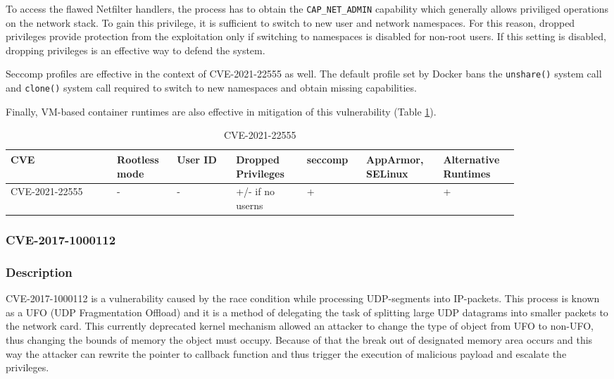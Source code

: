 To access the flawed Netfilter handlers, the process has to obtain the \texttt{CAP\_NET\_ADMIN} capability which generally allows priviliged operations on the network stack. To gain this privilege, it is sufficient to switch to new user and network namespaces. For this reason, dropped privileges provide protection from the exploitation only if switching to namespaces is disabled for non-root users. If this setting is disabled, dropping privileges is an effective way to defend the system. 

Seccomp profiles are effective in the context of CVE-2021-22555 as well. The default profile set by Docker bans the \texttt{unshare()} system call and \texttt{clone()} system call required to switch to new namespaces and obtain missing capabilities. 

Finally, VM-based container runtimes are also effective in mitigation of this vulnerability (Table \ref{tab:h:6}).

\begin{table}[H]
    \centering \small
    \begin{tabular}{| p{0.18\linewidth} | p{0.1\linewidth} | p{0.1\linewidth} | p{0.12\linewidth} | p{0.1\linewidth} | p{0.12\linewidth} | p{0.12\linewidth} |} \hline
    CVE & Rootless mode & User ID & Dropped Privileges & seccomp & AppArmor, SELinux & Alternative Runtimes \\ \hline
    CVE-2021-22555 & - & - & \cellcolor{yellow!25} +/- \linebreak if no userns & \cellcolor{green!25} + &  & \cellcolor{green!25} + \\ \hline
    \end{tabular}
    \caption{CVE-2021-22555}
    \label{tab:h:6}
\end{table}



\subsubsection{CVE-2017-1000112}
\subsubsection*{Description}

CVE-2017-1000112 is a vulnerability caused by the race condition while processing UDP-segments into IP-packets. This process is known as a UFO (UDP Fragmentation Offload) and it is a method of delegating the task of splitting large UDP datagrams into smaller packets to the network card. This currently deprecated kernel mechanism allowed an attacker to change the type of object from UFO to non-UFO, thus changing the bounds of memory the object must occupy. Because of that the break out of designated memory area occurs and this way the attacker can rewrite the pointer to callback function and thus trigger the execution of malicious payload and escalate the privileges. 

